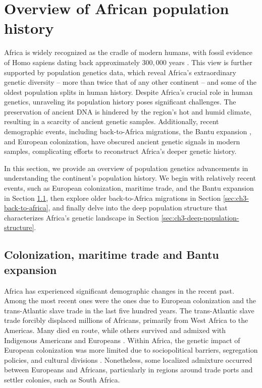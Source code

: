 \section{Overview of African population history}
\label{sec:ch3-lit-review}

Africa is widely recognized as the cradle of modern humans, with fossil evidence of Homo sapiens dating back approximately $300{,}000$ years \cite{day1969early,hublin2017new,bergstrom2021origins}. This view is further supported by population genetics data, which reveal Africa’s extraordinary genetic diversity -- more than twice that of any other continent \cite{yu2002larger} -- and some of the oldest population splits in human history. Despite Africa's crucial role in human genetics, unraveling its population history poses significant challenges. The preservation of ancient DNA is hindered by the region’s hot and humid climate, resulting in a scarcity of ancient genetic samples. Additionally, recent demographic events, including back-to-Africa migrations, the Bantu expansion \cite{tishkoff2009genetic}, and European colonization, have obscured ancient genetic signals in modern samples, complicating efforts to reconstruct Africa's deeper genetic history.

In this section, we provide an overview of population genetics advancements in understanding the continent’s population history. We begin with relatively recent events, such as European colonization, maritime trade, and the Bantu expansion in Section \ref{sec:ch3-bantu-europe}, then explore older back-to-Africa migrations in Section \ref{sec:ch3-back-to-africa}, and finally delve into the deep population structure that characterizes Africa’s genetic landscape in Section \ref{sec:ch3-deep-population-structure}.

\subsection{Colonization, maritime trade and Bantu expansion}
\label{sec:ch3-bantu-europe}

Africa has experienced significant demographic changes in the recent past. Among the most recent ones were the ones due to European colonization and the trans-Atlantic slave trade in the last five hundred years. The trans-Atlantic slave trade forcibly displaced millions of Africans, primarily from West Africa to the Americas. Many died en route, while others survived and admixed with Indigenous Americans and Europeans \cite{micheletti2020genetic}. Within Africa, the genetic impact of European colonization was more limited due to sociopolitical barriers, segregation policies, and cultural divisions \cite{tishkoff2009genetic}. Nonetheless, some localized admixture occurred between Europeans and Africans, particularly in regions around trade ports and settler colonies, such as South Africa.

